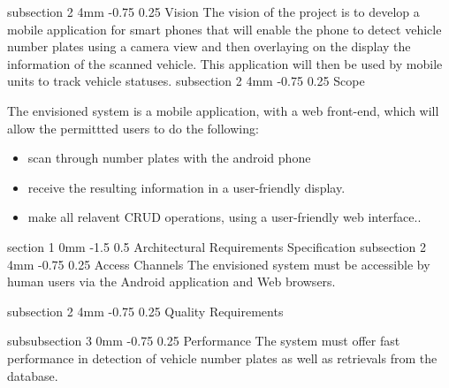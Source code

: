 \documentclass[12pt]{article}
\makeatletter
\renewcommand{\section}{\@startsection
   {section}%
   {1}%
   {0mm}%
   {-1.5\baselineskip}%
   {0.5\baselineskip}%
   {\sffamily\bfseries\upshape\normalsize}}%
\renewcommand{\subsection}{\@startsection
   {subsection}%
   {2}%
   {4mm}%
   {-0.75\baselineskip}%
   {0.25\baselineskip}%
   {\rmfamily\normalfont\scshape\normalsize}}%
\renewcommand{\subsubsection}{\@startsection
   {subsubsection}%
   {3}%
   {0mm}%
   {-0.75\baselineskip}%
   {0.25\baselineskip}%
   {\rmfamily\normalfont\slshape\normalsize}}%
\makeatother
\begin{document}
                		\subsection{Vision}
                				The vision of the project is to develop a mobile application for smart phones that will enable the phone to detect vehicle number plates using a camera view and then overlaying on the display the information of the scanned vehicle. This application will then be used by mobile units to track vehicle statuses. 
                		\subsection{Scope}
                			
                				The envisioned system is a mobile application, with a web front-end, which will allow the permittted users to do the following:
                			    		\begin{itemize}
                								\item scan through number plates with the android phone
                				                \item receive the resulting information in a user-friendly display.
                				                \item make all relavent CRUD operations, using a user-friendly web interface..
                				                
                			            \end{itemize}
                		
                \section{Architectural Requirements Specification}
                		\subsection{Access Channels }
                				The envisioned system must be accessible by human users via the Android application and Web browsers.
                			
                		\subsection{Quality Requirements}
                		
                				\subsubsection{Performance}
		   			                  	The system must offer fast performance in detection of vehicle number plates as well as retrievals from the database.
		   			                  	
\end{document}
